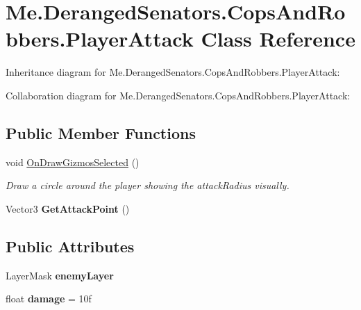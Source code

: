 \hypertarget{classMe_1_1DerangedSenators_1_1CopsAndRobbers_1_1PlayerAttack}{}\section{Me.\+Deranged\+Senators.\+Cops\+And\+Robbers.\+Player\+Attack Class Reference}
\label{classMe_1_1DerangedSenators_1_1CopsAndRobbers_1_1PlayerAttack}


Inheritance diagram for Me.\+Deranged\+Senators.\+Cops\+And\+Robbers.\+Player\+Attack\+:


Collaboration diagram for Me.\+Deranged\+Senators.\+Cops\+And\+Robbers.\+Player\+Attack\+:
\subsection*{Public Member Functions}
\begin{DoxyCompactItemize}
\item 
void \hyperlink{classMe_1_1DerangedSenators_1_1CopsAndRobbers_1_1PlayerAttack_a6d0a9e0cc8122d588767dc4593b27cef}{On\+Draw\+Gizmos\+Selected} ()
\begin{DoxyCompactList}\small\item\em Draw a circle around the player showing the attack\+Radius visually. \end{DoxyCompactList}\item 
\mbox{\label{classMe_1_1DerangedSenators_1_1CopsAndRobbers_1_1PlayerAttack_aedcbaff44397a0a46dca4a0b33c4f103}} 
Vector3 {\bfseries Get\+Attack\+Point} ()
\end{DoxyCompactItemize}
\subsection*{Public Attributes}
\begin{DoxyCompactItemize}
\item 
\mbox{\label{classMe_1_1DerangedSenators_1_1CopsAndRobbers_1_1PlayerAttack_a9758549dab00bf5b945fe7c5d0e8cae4}} 
Layer\+Mask {\bfseries enemy\+Layer}
\item 
\mbox{\label{classMe_1_1DerangedSenators_1_1CopsAndRobbers_1_1PlayerAttack_af1ecfd221e2eff1922a39ccd92be8404}} 
float {\bfseries damage} = 10f
\end{DoxyCompactItemize}


